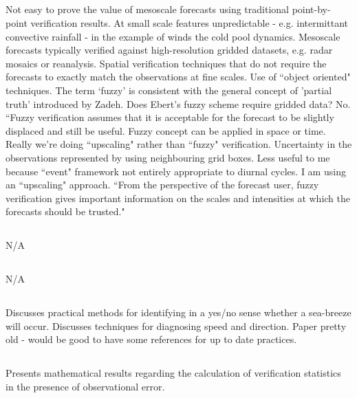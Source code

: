 \documentclass{article}
\begin{document}
\subsection{\citet{ebert08}}
Not easy to prove the value of mesoscale forecasts using traditional point-by-point verification results. At small scale features unpredictable - e.g. intermittant convective rainfall - in the example of winds the cold pool dynamics. Mesoscale forecasts typically verified against high-resolution gridded datasets, e.g. radar mosaics or reanalysis. Spatial verification techniques that do not require the forecasts to exactly match the observations at fine scales. Use of ``object oriented" techniques. The term `fuzzy' is consistent with the general concept of 'partial truth' introduced by Zadeh. Does Ebert's fuzzy scheme require gridded data? No. ``Fuzzy verification assumes that it is acceptable for the forecast to be slightly displaced and still be useful. Fuzzy concept can be applied in space or time. Really we're doing ``upscaling" rather than ``fuzzy" verification. Uncertainty in the observations represented by using neighbouring grid boxes. Less useful to me because ``event" framework not entirely appropriate to diurnal cycles. I am using an ``upscaling" approach. ``From the perspective of the forecast user, fuzzy verification gives important information on the scales and intensities at which the forecasts should be trusted."

\subsection{\citet{ebert00}}
N/A

\subsection{\citet{yates06}}
N/A

\subsection{\citet{mason08}}
Discusses practical methods for identifying in a yes/no sense whether a sea-breeze will occur. Discusses techniques for diagnosing speed and direction. Paper pretty old - would be good to have some references for up to date practices.  

\subsection{\citet{ferro17}}
Presents mathematical results regarding the calculation of verification statistics in the presence of observational error. 
\end{document}
